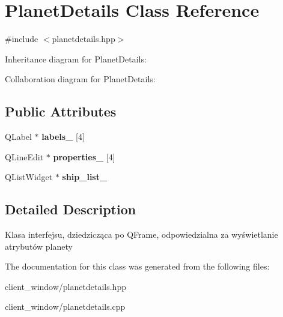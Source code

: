 \hypertarget{classPlanetDetails}{}\section{Planet\+Details Class Reference}
\label{classPlanetDetails}


{\ttfamily \#include $<$planetdetails.\+hpp$>$}



Inheritance diagram for Planet\+Details\+:


Collaboration diagram for Planet\+Details\+:
\subsection*{Public Attributes}
\begin{DoxyCompactItemize}
\item 
Q\+Label $\ast$ {\bfseries labels\+\_\+} \mbox{[}4\mbox{]}\hypertarget{classPlanetDetails_a6ec2dd5267f08b3420a06b57a0f38945}{}\label{classPlanetDetails_a6ec2dd5267f08b3420a06b57a0f38945}

\item 
Q\+Line\+Edit $\ast$ {\bfseries properties\+\_\+} \mbox{[}4\mbox{]}\hypertarget{classPlanetDetails_aaaa3aa4f674a526fc7dd577230d79cb7}{}\label{classPlanetDetails_aaaa3aa4f674a526fc7dd577230d79cb7}

\item 
Q\+List\+Widget $\ast$ {\bfseries ship\+\_\+list\+\_\+}\hypertarget{classPlanetDetails_a1c1c411c0e57ced10c510b395c907ca2}{}\label{classPlanetDetails_a1c1c411c0e57ced10c510b395c907ca2}

\end{DoxyCompactItemize}


\subsection{Detailed Description}
Klasa interfejsu, dziedzicząca po Q\+Frame, odpowiedzialna za wyświetlanie atrybutów planety 

The documentation for this class was generated from the following files\+:\begin{DoxyCompactItemize}
\item 
client\+\_\+window/planetdetails.\+hpp\item 
client\+\_\+window/planetdetails.\+cpp\end{DoxyCompactItemize}
